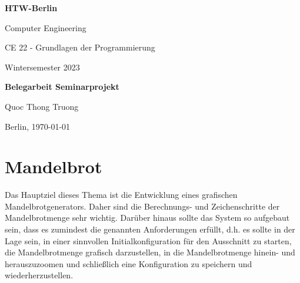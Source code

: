 \documentclass[ngerman,12pt,a4paper,titlepage]{article}
\begin{document}
\begin{titlepage}
	\setlength{\parindent}{0pt}
	\selectfont
	\centering
	{
		\huge\sffamily\bfseries
		HTW-Berlin \par
		\Large\sffamily\mdseries Computer Engineering\par
	}
	\vspace{2\baselineskip}
	{

		\Large\sffamily\mdseries CE 22 - Grundlagen der Programmierung\par
		\Large\sffamily\mdseries Wintersemester 2023 \par
		\vspace{3\baselineskip}
		\LARGE\sffamily\bfseries Belegarbeit Seminarprojekt \par
		\vspace{2\baselineskip}
	}
	\vfill
	{
		\Large\sffamily \mdseries Quoc Thong Truong \par
		\vspace{0.3\baselineskip}
		\large\vspace{2\baselineskip}
		\sffamily \mdseries Berlin, \today \par
		\vspace{1\baselineskip}


	}

\end{titlepage}
\newpage
{}
\tableofcontents

\newpage
\clearpage
{}

\newpage



\section{Mandelbrot}
Das Hauptziel dieses Thema ist die Entwicklung eines grafischen Mandelbrotgenerators. Daher sind die Berechnungs- und Zeichenschritte der Mandelbrotmenge sehr wichtig. Darüber hinaus sollte das System so aufgebaut sein, dass es zumindest die genannten Anforderungen erfüllt, d.h. es sollte in der Lage sein, in einer sinnvollen Initialkonfiguration für den Ausschnitt zu starten, die Mandelbrotmenge grafisch darzustellen, in die Mandelbrotmenge hinein- und herauszuzoomen und schließlich eine Konfiguration zu speichern und wiederherzustellen.
 
\end{document}
